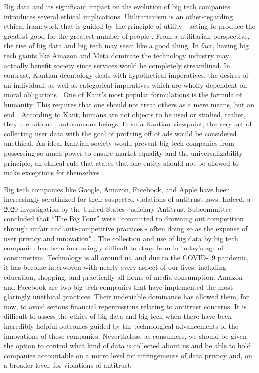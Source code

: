 \documentclass[twoside]{article}
\begin{document}
Big data and its significant impact on the evolution of big tech companies introduces several ethical implications. Utilitarianism is an other-regarding ethical framework that is guided by the principle of utility - acting to produce the greatest good for the greatest number of people \cite{crashcourse2}. From a utilitarian perspective, the rise of big data and big tech may seem like a good thing. In fact, having big tech giants like Amazon and Meta dominate the technology industry may actually benefit society since services would be completely streamlined. In contrast, Kantian deontology deals with hypothetical imperatives, the desires of an individual, as well as categorical imperatives which are wholly dependent on moral obligations \cite{crashcourse1}. One of Kant's most popular formulations is the formula of humanity. This requires that one should not treat others as a mere means, but an end \cite{crashcourse1}. According to Kant, humans are not objects to be used or studied, rather, they are rational, autonomous beings. From a Kantian viewpoint, the very act of collecting user data with the goal of profiting off of ads would be considered unethical. An ideal Kantian society would prevent big tech companies from possessing so much power to ensure market equality and the universalizability principle, an ethical rule that states that one entity should not be allowed to make exceptions for themselves \cite{crashcourse1}.

Big tech companies like Google, Amazon, Facebook, and Apple have been increasingly scrutinized for their suspected violations of antitrust laws. Indeed, a 2020 investigation by the United States Judiciary Antitrust Subcommittee concluded that “The Big Four” were “committed to drowning out competition through unfair and anti-competitive practices - often doing so as the expense of user privacy and innovation" \cite{monopoly}. The collection and use of big data by big tech companies has been increasingly difficult to stray from in today’s age of consumerism. Technology is all around us, and due to the COVID-19 pandemic, it has become interwoven with nearly every aspect of our lives, including education, shopping, and practically all forms of media consumption. Amazon and Facebook are two big tech companies that have implemented the most glaringly unethical practices. Their undeniable dominance has allowed them, for now, to avoid serious financial repercussions relating to antitrust concerns. It is difficult to assess the ethics of big data and big tech when there have been incredibly helpful outcomes guided by the technological advancements of the innovations of these companies. Nevertheless, as consumers, we should be given the option to control what kind of data is collected about us and be able to hold companies accountable on a micro level for infringements of data privacy and, on a broader level, for violations of antitrust.

\newpage
\printbibliography
\end{document}
